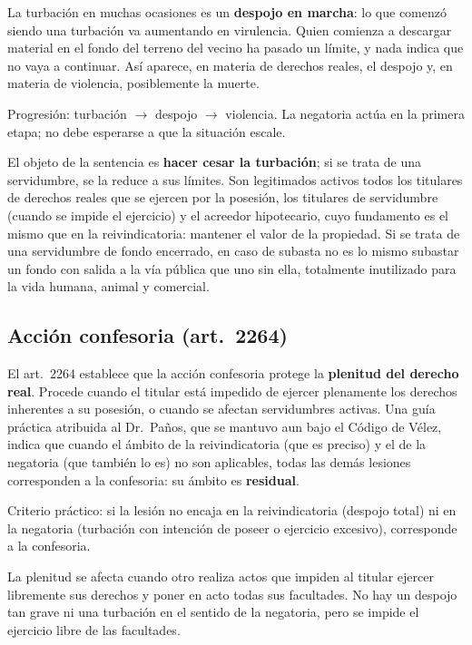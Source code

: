 \documentclass[12pt,oneside]{book}
\begin{document}
La turbación en muchas ocasiones es un \textbf{despojo en marcha}: lo que comenzó siendo una turbación va aumentando en virulencia. Quien comienza a descargar material en el fondo del terreno del vecino ha pasado un límite, y nada indica que no vaya a continuar. Así aparece, en materia de derechos reales, el despojo y, en materia de violencia, posiblemente la muerte.

\begin{important}
Progresión: turbación $\rightarrow$ despojo $\rightarrow$ violencia. La negatoria actúa en la primera etapa; no debe esperarse a que la situación escale.
\end{important}

El objeto de la sentencia es \textbf{hacer cesar la turbación}; si se trata de una servidumbre, se la reduce a sus límites. Son legitimados activos todos los titulares de derechos reales que se ejercen por la posesión, los titulares de servidumbre (cuando se impide el ejercicio) y el acreedor hipotecario, cuyo fundamento es el mismo que en la reivindicatoria: mantener el valor de la propiedad. Si se trata de una servidumbre de fondo encerrado, en caso de subasta no es lo mismo subastar un fondo con salida a la vía pública que uno sin ella, totalmente inutilizado para la vida humana, animal y comercial.

\subsection{Acción confesoria (art.~2264)}

El art.~2264 establece que la acción confesoria protege la \textbf{plenitud del derecho real}. Procede cuando el titular está impedido de ejercer plenamente los derechos inherentes a su posesión, o cuando se afectan servidumbres activas. Una guía práctica atribuida al Dr.~Paños, que se mantuvo aun bajo el Código de Vélez, indica que cuando el ámbito de la reivindicatoria (que es preciso) y el de la negatoria (que también lo es) no son aplicables, todas las demás lesiones corresponden a la confesoria: su ámbito es \textbf{residual}.

\begin{important}
Criterio práctico: si la lesión no encaja en la reivindicatoria (despojo total) ni en la negatoria (turbación con intención de poseer o ejercicio excesivo), corresponde a la confesoria.
\end{important}

La plenitud se afecta cuando otro realiza actos que impiden al titular ejercer libremente sus derechos y poner en acto todas sus facultades. No hay un despojo tan grave ni una turbación en el sentido de la negatoria, pero se impide el ejercicio libre de las facultades.
\end{document}
